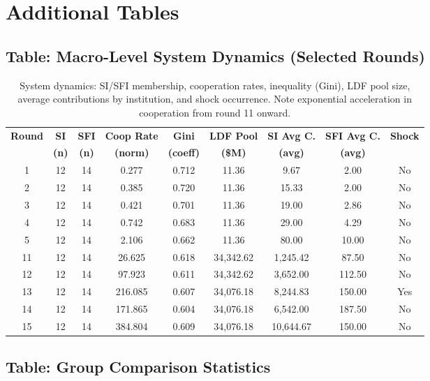 \documentclass[12pt]{article}
\begin{document}
\section*{Additional Tables}

\subsection*{Table: Macro-Level System Dynamics (Selected Rounds)}

\begin{table}[h]
\centering
\small
\begin{tabularx}{0.9\textwidth}{ccccccccc}
\toprule
\textbf{Round} & \textbf{SI} & \textbf{SFI} & \textbf{Coop Rate} & \textbf{Gini} & \textbf{LDF Pool} & \textbf{SI Avg C.} & \textbf{SFI Avg C.} & \textbf{Shock} \\
& \textbf{(n)} & \textbf{(n)} & \textbf{(norm)} & \textbf{(coeff)} & \textbf{(\$M)} & \textbf{(avg)} & \textbf{(avg)} & \\
\midrule
1 & 12 & 14 & 0.277 & 0.712 & 11.36 & 9.67 & 2.00 & No \\
2 & 12 & 14 & 0.385 & 0.720 & 11.36 & 15.33 & 2.00 & No \\
3 & 12 & 14 & 0.421 & 0.701 & 11.36 & 19.00 & 2.86 & No \\
4 & 12 & 14 & 0.742 & 0.683 & 11.36 & 29.00 & 4.29 & No \\
5 & 12 & 14 & 2.106 & 0.662 & 11.36 & 80.00 & 10.00 & No \\
\midrule
11 & 12 & 14 & 26.625 & 0.618 & 34,342.62 & 1,245.42 & 87.50 & No \\
12 & 12 & 14 & 97.923 & 0.611 & 34,342.62 & 3,652.00 & 112.50 & No \\
13 & 12 & 14 & 216.085 & 0.607 & 34,076.18 & 8,244.83 & 150.00 & Yes \\
14 & 12 & 14 & 171.865 & 0.604 & 34,076.18 & 6,542.00 & 187.50 & No \\
15 & 12 & 14 & 384.804 & 0.609 & 34,076.18 & 10,644.67 & 150.00 & No \\
\bottomrule
\end{tabularx}
\caption{System dynamics: SI/SFI membership, cooperation rates, inequality (Gini), LDF pool size, average contributions by institution, and shock occurrence. Note exponential acceleration in cooperation from round 11 onward.}
\end{table}

\subsection*{Table: Group Comparison Statistics}
\end{document}
